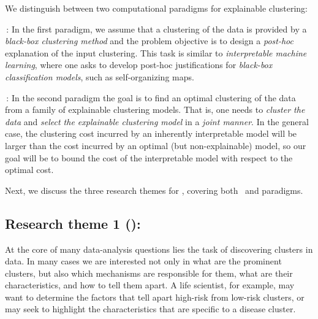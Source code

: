 \documentclass[a4paper,11pt]{article}
\begin{document}
\vspace{-2mm}
\noindent We distinguish between two computational paradigms for explainable clustering:

\smallskip
{\posthoc\,:}
In the first paradigm, we assume that a clustering of the data is provided 
by a \emph{black-box clustering method} and the problem objective is to design 
a \emph{post-hoc} explanation of the input clustering.
This task is similar to \emph{interpretable machine learning}, 
where one asks to develop post-hoc justifications for 
\emph{black-box classification models}, such as self-organizing maps. 

\smallskip
{\joint\,:}
In the second paradigm the goal is to find an optimal clustering of the data
from a family of explainable clustering models.
That is, one needs to \emph{cluster the data} and \emph{select the explainable clustering model}
in a \emph{joint manner}.
In the general case, the clustering cost incurred by an inherently interpretable model 
will be larger than the cost incurred by an optimal (but non-explainable) model, 
so our goal will be to bound the cost of the interpretable model with respect to the optimal cost.

\smallskip
Next, we discuss the three research themes for \acronym, covering both \posthoc\ and \joint paradigms.


\subsection*{Research theme 1 (\rto): \newmodels}

At the core of many data-analysis questions lies the task of discovering clusters in data. 
In many cases we are interested not only in what are the prominent clusters, 
but also which mechanisms are responsible for them,  
what are their characteristics, and how to tell them apart.  
A life scientist, for example, may want to determine the factors that tell apart 
high-risk from low-risk clusters, 
or may seek to highlight the characteristics that are specific to a disease cluster.  
\end{document}
